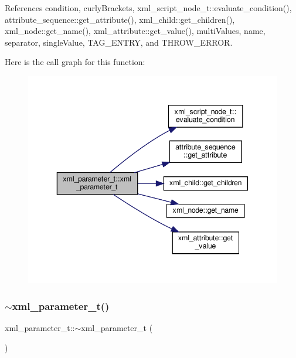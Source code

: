 References condition, curly\+Brackets, xml\+\_\+script\+\_\+node\+\_\+t\+::evaluate\+\_\+condition(), attribute\+\_\+sequence\+::get\+\_\+attribute(), xml\+\_\+child\+::get\+\_\+children(), xml\+\_\+node\+::get\+\_\+name(), xml\+\_\+attribute\+::get\+\_\+value(), multi\+Values, name, separator, single\+Value, T\+A\+G\+\_\+\+E\+N\+T\+RY, and T\+H\+R\+O\+W\+\_\+\+E\+R\+R\+OR.

Here is the call graph for this function\+:
\nopagebreak
\begin{figure}[H]
\begin{center}
\leavevmode
\includegraphics[width=343pt]{d4/dfd/classxml__parameter__t_a7ba134d6d789710c6cccb959c955341f_cgraph}
\end{center}
\end{figure}
\mbox{\label{classxml__parameter__t_af7b5e493a443865d557b36082b5ab4a7}} 
\subsubsection{\texorpdfstring{$\sim$xml\+\_\+parameter\+\_\+t()}{~xml\_parameter\_t()}}
{\footnotesize\ttfamily xml\+\_\+parameter\+\_\+t\+::$\sim$xml\+\_\+parameter\+\_\+t (\begin{DoxyParamCaption}{ }\end{DoxyParamCaption})\hspace{0.3cm}{\ttfamily [override]}}




